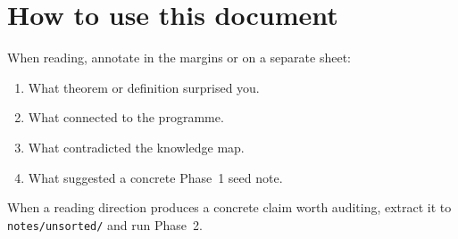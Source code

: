 \section*{How to use this document}

When reading, annotate in the margins or on a separate sheet:
\begin{enumerate}[nosep]
  \item What theorem or definition surprised you.
  \item What connected to the programme.
  \item What contradicted the knowledge map.
  \item What suggested a concrete Phase~1 seed note.
\end{enumerate}

\noindent
When a reading direction produces a concrete claim worth auditing,
extract it to \texttt{notes/unsorted/} and run Phase~2.

